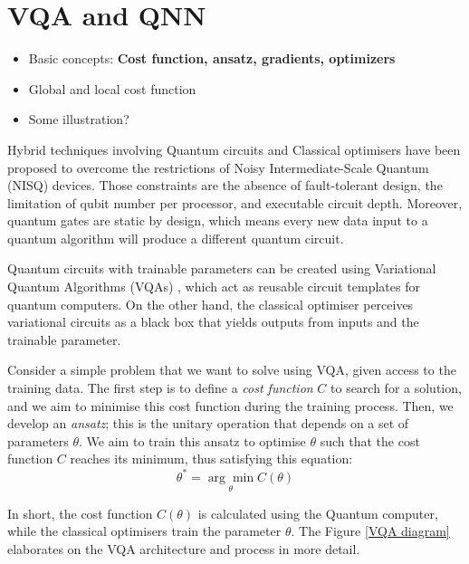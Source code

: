 \section{VQA and QNN}
\begin{itemize}
    \item Basic concepts: \textbf{Cost function, ansatz, gradients, optimizers}
    \item Global and local cost function
    \item Some illustration?
\end{itemize}

Hybrid techniques involving Quantum circuits and Classical optimisers have been proposed to overcome the restrictions of Noisy Intermediate-Scale Quantum (NISQ) \cite{brooksQuantumSupremacyHunt2019} devices. 
Those constraints are the absence of fault-tolerant design, the limitation of qubit number per processor, and executable circuit depth. 
Moreover, quantum gates are static by design, which means every new data input to a quantum algorithm will produce a different quantum circuit.

Quantum circuits with trainable parameters can be created using Variational Quantum Algorithms (VQAs) \cite{cerezo2021variational}, which act as reusable circuit templates for quantum computers.
On the other hand, the classical optimiser perceives variational circuits as a black box that yields outputs from inputs and the trainable parameter.

Consider a simple problem that we want to solve using VQA, given access to the training data.
The first step is to define a \textit{cost function} $C$ to search for a solution, and we aim to minimise this cost function during the training process.
Then, we develop an \textit{ansatz}; this is the unitary operation that depends on a set of parameters $\theta$. We aim to train this ansatz to optimise $\theta$ such that the cost function $C$ reaches its minimum, thus satisfying this equation:
\begin{equation}
    \theta^* = \underset{\theta}{\arg \min} C(\theta)
    \label{optimize theta with ansatz}
\end{equation}

In short, the cost function $C(\theta)$ is calculated using the Quantum computer, while the classical optimisers train the parameter $\theta$. The Figure \ref{VQA diagram} elaborates on the VQA architecture and process in more detail.

